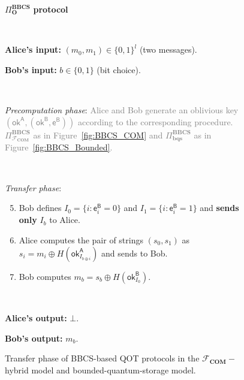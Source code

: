 \begin{figure}[h!]
    \centering
        \begin{tcolorbox}
            
            \centerline{$\Pi^{\textbf{BBCS}}_{\textbf{O}}$ \textbf{protocol}}
            
            \
            
            \textbf{Alice's input:} $(m_0, m_1)\in\{0,1\}^l$ (two messages). 
            
            \textbf{Bob's input:} $b\in\{0,1\}$ (bit choice).
            
            \
            

            
            \textit{Precomputation phase}: \textcolor{gray}{Alice and Bob generate an oblivious key $(\mathsf{ok}^{\mathsf{A}}, (\mathsf{ok}^{\mathsf{B}}, \mathsf{e}^{\mathsf{B}}))$ according to the corresponding procedure. $\Pi^{\textbf{BBCS}}_{\mathcal{F}_{\textbf{COM}}}$ as in Figure~\ref{fig:BBCS_COM} and $\Pi^{\textbf{BBCS}}_{\textbf{bqs}}$ as in Figure~\ref{fig:BBCS_Bounded}.}
            
            \
            
            \textit{Transfer phase}:
            \begin{enumerate}
            \setcounter{enumi}{4}
                \item Bob defines $I_0 = \{ i : \mathsf{e}^{\mathsf{B}}_i = 0 \}$ and $I_1 = \{ i : \mathsf{e}^{\mathsf{B}}_i = 1 \}$ and \textbf{sends only} $I_b$ to Alice.
                \item Alice computes the pair of strings $(s_0, s_1)$ as $s_i = m_i \oplus H(\mathsf{ok}^{\mathsf{A}}_{I_{b\oplus i}})$ and sends to Bob.
                \item Bob computes $m_b = s_b \oplus  H(\mathsf{ok}^{\mathsf{B}}_{I_0})$. 
            \end{enumerate}
            
            \
            
        \textbf{Alice's output:} $\bot$.
        
        \textbf{Bob's output:} $m_b$.
        
        \end{tcolorbox}
    \caption{Transfer phase of BBCS-based QOT protocols in the $\mathcal{F}_{\mathbf{COM}}-$hybrid model and bounded-quantum-storage model.}
    \label{fig:BBCS_Transfer-optimized}
\end{figure}



